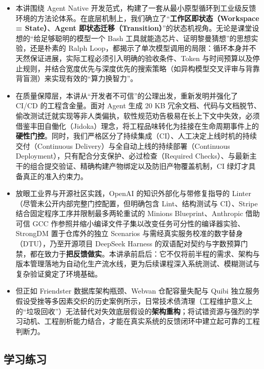 \documentclass[UTF8,a4paper,11pt,fontset=fandol]{ctexart}
\begin{document}
\begin{itemize}
\item 本讲围绕 Agent Native 开发范式，构建了一套从最小原型循环到工业级反馈环境的方法论体系。在底层机制上，我们确立了“\textbf{工作区即状态（Workspace = State）}、\textbf{Agent 即状态迁移（Transition）}”的状态机视角。无论是课堂设想的“给足够聪明的模型一个 Bash 工具就能造芯片、证明黎曼猜想”的思想实验，还是朴素的 Ralph Loop，都揭示了单次模型调用的局限：循环本身并不天然保证进展，实际工程必须引入明确的验收条件、Token 与时间预算以及停止规则，并结合宽度优先与深度优先的搜索策略（如异构模型交叉评审与背靠背盲测）来实现有效的“算力换智力”。



\item 在质量保障层，本讲从“开发者不可信”的公理出发，重新发明并强化了 CI/CD 的工程含金量。面对 Agent 生成 20 KB 冗余文档、代码与文档脱节、偷改测试迁就实现等非人类偏执，软性规范劝告极易在长上下文中失效，必须借鉴丰田自{\cjkfallback 働}化（Jidoka）理念，将工程品味转化为挂接在生命周期事件上的\textbf{硬性门控}。同时，我们严格区分了持续集成（CI）、人工决定上线时机的持续交付（Continuous Delivery）与全自动上线的持续部署（Continuous Deployment），只有配合分支保护、必过检查（Required Checks）、与最新主干的组合提交验证、精确构建产物绑定以及防旧产物覆盖机制，CI 绿灯才具备真正的准入约束力。



\item 放眼工业界与开源社区实践，OpenAI 的知识外部化与带修复指导的 Linter（尽管未公开内部完整门控配置，但明确包含 Lint、结构测试与 CI）、Stripe 结合固定程序工序并限制最多两轮重试的 Minions Blueprint、Anthropic 借助可信 GCC 作参照并缩小编译文件子集以改变任务可分性的编译器实验、StrongDM 置于仓库外的独立 Scenarios 与需经真实服务校准的数字替身（DTU），乃至开源项目 DeepSeek Harness 的双语配对契约与字数预算门禁，都在致力于\textbf{把反馈做实}。本讲承前启后：它不仅将前半程的需求、架构与版本管理落地为自动化生产流水线，更为后续课程深入系统测试、模糊测试与复杂验证奠定了环境基础。

\item 但正如 Friendster 数据库架构瓶颈、Webvan 仓配容量失配与 Quibi 独立服务假设受挫等多因素交织的历史案例所示，日常技术债清理（工程维护意义上的“垃圾回收”）无法替代对失效底层假设的\textbf{架构重构}；将试错资源与强烈的学习动机、工程剖析能力结合，才能在真实系统的反馈闭环中建立起可靠的工程判断力。
\end{itemize}

\subsection{学习练习}
\end{document}
